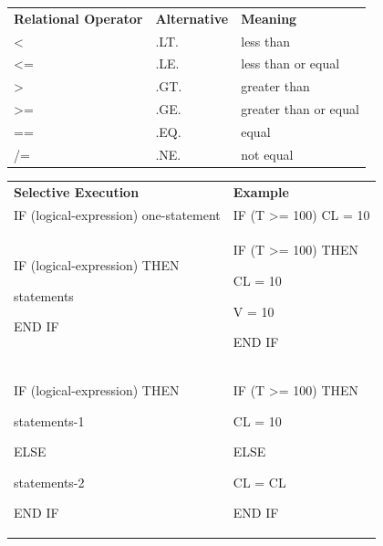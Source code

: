 \documentclass[
]{book}
\begin{document}
\begin{longtable}[]{@{}lll@{}}
\toprule
\endhead
\textbf{Relational Operator} & \textbf{Alternative} & \textbf{Meaning} \\
\textless{} & .LT. & less than \\
\textless= & .LE. & less than or equal \\
\textgreater{} & .GT. & greater than \\
\textgreater= & .GE. & greater than or equal \\
== & .EQ. & equal \\
/= & .NE. & not equal \\
\bottomrule
\end{longtable}

\begin{longtable}[]{@{}
  >{\raggedright\arraybackslash}p{}
  >{\raggedright\arraybackslash}p{}@{}}
\toprule
\endhead
\textbf{Selective Execution} & \textbf{Example} \\
IF (logical-expression) one-statement & IF (T \textgreater= 100) CL = 10 \\
IF (logical-expression) THEN

statements

END IF & IF (T \textgreater= 100) THEN

CL = 10

V = 10

END IF \\
IF (logical-expression) THEN

statements-1

ELSE

statements-2

END IF & IF (T \textgreater= 100) THEN

CL = 10

ELSE

CL = CL

END IF \\
\bottomrule
\end{longtable}

  
\end{document}
